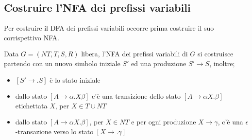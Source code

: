 \subsection{Costruire l'NFA dei prefissi variabili}

Per costruire il DFA dei prefissi variabili occorre prima costruire il suo corrispettivo NFA.

Data $G=(NT, T, S, R)$ libera, l'NFA dei prefissi variabili di $G$ si costruisce partendo con un nuovo simbolo iniziale $S'$ ed una produzione $S' \to S$, inoltre;
\begin{itemize}
    \item $[S'\to .S]$ è lo stato iniziale 
    \item dallo stato $[A\to \alpha.X\beta]$ c'è una transizione dello stato $[A\to \alpha X.\beta]$ etichettata $X$, per $X\in T\cup NT$
    \item dallo stato $[A\to \alpha X. \beta]$, per $X\in NT$ e per ogni produzione $X\to \gamma$, c'è una $\epsilon$-transazione verso lo stato $[X\to .\gamma]$
\end{itemize}

